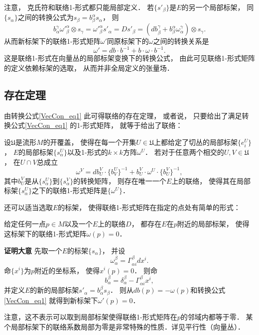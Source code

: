 注意， 克氏符和联络1-形式都只能局部定义． 若$\{s'_\beta\}$是$E$的另一个局部标架， 同$\{s_\alpha\}$之间的转换公式为$s_\beta=b_\beta^\alpha s_\alpha$， 则
$$
b_\alpha^\gamma{\omega'}_{\beta}^{\alpha}\otimes s_\gamma={\omega'}_{\beta}^{\alpha}s'_\alpha=Ds'_\beta=(db_\beta^\gamma+b_\beta^\alpha\omega_\alpha^\gamma)\otimes s_\gamma.
$$
从而新标架下的联络1-形式矩阵$\omega'$同原标架下的$\omega$之间的转换关系是
\begin{equation}\label{VecCon_eq1}
\omega'=db\cdot b^{-1}+b\cdot\omega\cdot b^{-1}.
\end{equation}
这是联络1-形式在向量丛的局部标架变换下的转换公式， 由此可见联络1-形式矩阵的定义依赖标架的选取， 从而并非全局定义的张量场．

\subsection{存在定理}
由转换公式\autoref{VecCon_eq1} 此可得联络的存在定理， 或者说， 只要给出了满足转换公式\autoref{VecCon_eq1} 的1-形式矩阵， 就等于给出了联络：
\begin{theorem}{}
设$\mathfrak{U}$是流形$M$的开覆盖， 使得在每一个开集$U\in\mathfrak{U}$上都给定了切丛的局部标架$\{e^U_i\}$， $E$的局部标架$\{s^U_\alpha\}$以及1-形式的$k\times k$方阵$\omega^U$． 若对于任意两个相交的$U,V\in\mathfrak{U}$， 在$U\cap V$总成立
$$
\omega^V=db^V_U\cdot \{b_V^U\}^{-1}+b^V_U\cdot\omega^U\cdot \{b^V_U\}^{-1},
$$
其中$b^V_U$是从$\{s^U_\alpha\}$到$\{s^V_\alpha\}$的转换矩阵， 则存在唯一一个$E$上的联络， 使得其在局部标架$\{s^U_\alpha\}$之下的联络1-形式矩阵是$\{\omega^U\}$．
\end{theorem}

还可以适当选取$E$的标架， 使得联络1-形式矩阵在指定的点处有简单的形式：
\begin{theorem}{}
给定任何一点$p\in M$以及一个$E$上的联络$D$， 都存在$E$在$p$附近的局部标架， 使得这标架下的联络1-形式矩阵$\omega(p)=0$．
\end{theorem}
\textbf{证明大意} 先取一个$E$的标架$\{s_\alpha\}$， 并设
$$
\omega^\beta_\alpha=\Gamma_{\alpha i}^\beta dx^i.
$$
命$\{x^i\}$为$p$附近的坐标系， 使得$x^i(p)=0$． 则命
$$
b_\alpha^\beta=\delta_\alpha^\beta-\Gamma_{\alpha i}^\beta x^i,
$$
并定义$E$的新的局部标架$s'_\alpha=b_\alpha^\beta s_\beta$． 则从$db(p)=-\omega(p)$和转换公式\autoref{VecCon_eq1} 就得到新标架下$\omega'(p)=0$．

注意，这不表示可以取到局部标架使得联络1-形式矩阵在$p$的邻域内都等于零． 某个局部标架下的联络系数局部为零是非常特殊的性质．详见平行性（向量丛）．

